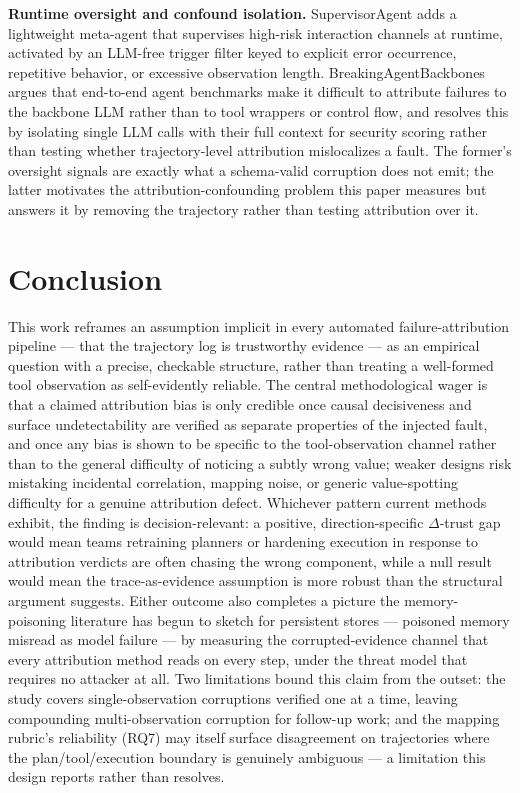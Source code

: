 \documentclass[11pt]{article}
\begin{document}
\textbf{Runtime oversight and confound isolation.} SupervisorAgent \citep{SupervisorAgentpzFhtpkabh} adds a lightweight meta-agent that supervises high-risk interaction channels at runtime, activated by an LLM-free trigger filter keyed to explicit error occurrence, repetitive behavior, or excessive observation length. BreakingAgentBackbones \citep{BreakingAgentBackboneskga18ld70t} argues that end-to-end agent benchmarks make it difficult to attribute failures to the backbone LLM rather than to tool wrappers or control flow, and resolves this by isolating single LLM calls with their full context for security scoring rather than testing whether trajectory-level attribution mislocalizes a fault. The former's oversight signals are exactly what a schema-valid corruption does not emit; the latter motivates the attribution-confounding problem this paper measures but answers it by removing the trajectory rather than testing attribution over it.

\section{Conclusion}

This work reframes an assumption implicit in every automated failure-attribution pipeline --- that the trajectory log is trustworthy evidence --- as an empirical question with a precise, checkable structure, rather than treating a well-formed tool observation as self-evidently reliable. The central methodological wager is that a claimed attribution bias is only credible once causal decisiveness and surface undetectability are verified as separate properties of the injected fault, and once any bias is shown to be specific to the tool-observation channel rather than to the general difficulty of noticing a subtly wrong value; weaker designs risk mistaking incidental correlation, mapping noise, or generic value-spotting difficulty for a genuine attribution defect. Whichever pattern current methods exhibit, the finding is decision-relevant: a positive, direction-specific $\Delta$-trust gap would mean teams retraining planners or hardening execution in response to attribution verdicts are often chasing the wrong component, while a null result would mean the trace-as-evidence assumption is more robust than the structural argument suggests. Either outcome also completes a picture the memory-poisoning literature has begun to sketch for persistent stores \citep{MisattributionGap260522842} --- poisoned memory misread as model failure --- by measuring the corrupted-evidence channel that every attribution method reads on every step, under the threat model that requires no attacker at all. Two limitations bound this claim from the outset: the study covers single-observation corruptions verified one at a time, leaving compounding multi-observation corruption for follow-up work; and the mapping rubric's reliability (RQ7) may itself surface disagreement on trajectories where the plan/tool/execution boundary is genuinely ambiguous --- a limitation this design reports rather than resolves.
\end{document}
